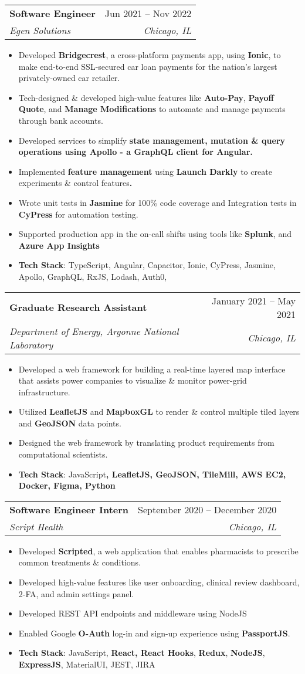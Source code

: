 \documentclass[letterpaper,11pt]{article}
\makeatletter
\newcommand{\resumeItem}[1]{
  \item\small{
    {#1 \vspace{-2pt}}
  }
}
\newcommand{\resumeSubheading}[4]{
  \vspace{-2pt}\item
    \begin{tabular*}{0.97\textwidth}[t]{l@{\extracolsep{\fill}}r}
      \textbf{#1} & #2 \\
      \textit{\small#3} & \textit{\small #4} \\
    \end{tabular*}\vspace{-7pt}
}
\newcommand{\resumeItemListStart}{\begin{itemize}}
\newcommand{\resumeItemListEnd}{\end{itemize}\vspace{-5pt}}
\makeatother
\begin{document}
    \resumeSubheading
      { Software Engineer  }{Jun 2021 – Nov 2022}
      {Egen Solutions}{Chicago, IL}
      \resumeItemListStart
        \resumeItem{Developed \textbf{Bridgecrest}, a cross-platform payments app, using \textbf{Ionic}, to make end-to-end SSL-secured car loan payments for the nation's largest privately-owned car retailer.}
        \resumeItem {Tech-designed \& developed high-value features like\textbf{ Auto-Pay}, \textbf{Payoff Quote}, and \textbf{Manage Modifications} to automate and manage payments through bank accounts.}
        \resumeItem{Developed services to simplify \textbf{state management, \textbf{mutation} \& \textbf{query} operations using \textbf{Apollo} - a \textbf{GraphQL} client for \textbf{Angular}.}}
        \resumeItem{Implemented \textbf{feature management }using\textbf{ \textbf{Launch Darkly} }to\textbf{ }create experiments \& control features\textbf{.}}
         \resumeItem{Wrote unit tests in \textbf{Jasmine} for 100\% code coverage and Integration tests in \textbf{CyPress} for automation testing. }
         \resumeItem{Supported production app in the on-call shifts using tools like \textbf{Splunk}, and \textbf{Azure App Insights}}
        \resumeItem {\textbf{Tech Stack}: TypeScript, Angular, Capacitor, Ionic, CyPress, Jasmine, Apollo, GraphQL, RxJS, Lodash, Auth0, }
      \resumeItemListEnd
      
    \resumeSubheading
      {Graduate Research Assistant}{January 2021 – May 2021}
      {Department of Energy, Argonne National Laboratory}{Chicago, IL}
      \resumeItemListStart
        \resumeItem{Developed a web framework for building a real-time layered map interface that assists power companies to visualize \& monitor power-grid infrastructure.}
        \resumeItem{Utilized \textbf{LeafletJS} and \textbf{MapboxGL} to render \& control multiple tiled layers and \textbf{GeoJSON} data points.}
        \resumeItem{Designed the web framework by translating  product requirements from computational scientists.}
        \resumeItem{\textbf{Tech Stack}: JavaScript\textbf{, LeafletJS, GeoJSON, TileMill, AWS EC2, Docker, Figma, Python}}
      \resumeItemListEnd
      
    \resumeSubheading
      {Software Engineer Intern}{September 2020 – December 2020}
      {Script Health}{Chicago, IL}
      \resumeItemListStart
        \resumeItem{Developed \textbf{Scripted},  a web application that enables pharmacists to prescribe common treatments \& conditions.}
        \resumeItem{Developed high-value features like user onboarding, clinical review dashboard, 2-FA, and admin settings panel. }
        \resumeItem{Developed  REST API endpoints and middleware using NodeJS }
        \resumeItem{Enabled Google \textbf{O-Auth} log-in and sign-up experience using \textbf{PassportJS}.  }
        \resumeItem{\textbf{Tech Stack}: JavaScript, \textbf{React, React Hooks}, \textbf{Redux}, \textbf{NodeJS}, \textbf{ExpressJS}, MaterialUI, JEST, JIRA}
      \resumeItemListEnd
      
\end{document}
